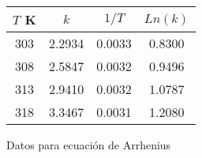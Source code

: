 \begin{figure}[H]
    \centering
    \begin{tabular}{cccc}
    \hline
    $T$ K & $k$  & $1/T$ & $Ln(k)$ \\
    \hline
    303	& 2.2934 &	0.0033	& 0.8300 \\
    308	& 2.5847 &	0.0032	& 0.9496 \\
    313	& 2.9410 &	0.0032	& 1.0787 \\
    318	& 3.3467 &	0.0031	& 1.2080 \\

    \hline

    \end{tabular} 
\caption{Datos para ecuación de Arrhenius}
    \label{fig:my_label}
\end{figure}\\